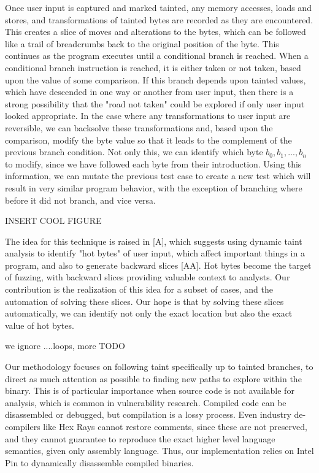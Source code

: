 \documentclass[11pt,expanded,copyright]{fsuthesis}
\begin{document}
Once user input is captured and marked tainted, any memory accesses, loads and stores, and transformations of tainted bytes are recorded as they are encountered. This creates a slice of moves and alterations to the bytes, which can be followed like a trail of breadcrumbs back to the original position of the byte. This continues as the program executes until a conditional branch is reached. When a conditional branch instruction is reached, it is either taken or not taken, based upon the value of some comparison. If this branch depends upon tainted values, which have descended in one way or another from user input, then there is a strong possibility that the "road not taken" could be explored if only user input looked appropriate. In the case where any transformations to user input are reversible, we can backsolve these transformations and, based upon the comparison, modify the byte value so that it leads to the complement of the previous branch condition. Not only this, we can identify which byte $b_0,b_1,...,b_n$ to modify, since we have followed each byte from their introduction. Using this information, we can mutate the previous test case to create a new test which will result in very similar program behavior, with the exception of branching where before it did not branch, and vice versa.

INSERT COOL FIGURE

The idea for this technique is raised in [A], which suggests using dynamic taint analysis to identify "hot bytes" of user input, which affect important things in a program, and also to generate backward slices [AA]. Hot bytes become the target of fuzzing, with backward slices providing valuable context to analysts. Our contribution is the realization of this idea for a subset of cases, and the automation of solving these slices. Our hope is that by solving these slices automatically, we can identify not only the exact location but also the exact value of hot bytes. 

we ignore ....loops, more TODO

Our methodology focuses on following taint specifically up to tainted branches, to direct as much attention as possible to finding new paths to explore within the binary. This is of particular importance when source code is not available for analysis, which is common in vulnerability research. Compiled code can be disassembled or debugged, but compilation is a lossy process. Even industry de-compilers like Hex Rays cannot restore comments, since these are not preserved, and they cannot guarantee to reproduce the exact higher level language semantics, given only assembly language. Thus, our implementation relies on Intel Pin to dynamically disassemble compiled binaries.
\end{document}
